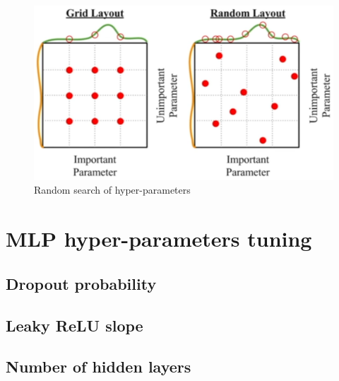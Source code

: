 \documentclass[12pt]{article}
\begin{document}
\begin{figure}[h]
\centering
\includegraphics[width=.6\linewidth]{pics/random_search}
\caption{Random search of hyper-parameters}
\end{figure}


\section{MLP hyper-parameters tuning}
\subsection{Dropout probability}
\subsection{Leaky ReLU slope}
\subsection{Number of hidden layers}
\end{document}
